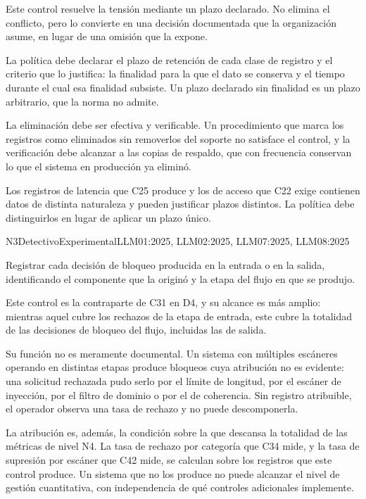 Este control resuelve la tensión mediante un plazo declarado. No elimina el conflicto, pero lo convierte en una decisión documentada que la organización asume, en lugar de una omisión que la expone.

La política debe declarar el plazo de retención de cada clase de registro y el criterio que lo justifica: la finalidad para la que el dato se conserva y el tiempo durante el cual esa finalidad subsiste. Un plazo declarado sin finalidad es un plazo arbitrario, que la norma no admite.

La eliminación debe ser efectiva y verificable. Un procedimiento que marca los registros como eliminados sin removerlos del soporte no satisface el control, y la verificación debe alcanzar a las copias de respaldo, que con frecuencia conservan lo que el sistema en producción ya eliminó.

Los registros de latencia que C25 produce y los de acceso que C22 exige contienen datos de distinta naturaleza y pueden justificar plazos distintos. La política debe distinguirlos en lugar de aplicar un plazo único.


  {N3}{Detectivo}{Experimental}{LLM01:2025, LLM02:2025, LLM07:2025, LLM08:2025}

Registrar cada decisión de bloqueo producida en la entrada o en la salida, identificando el componente que la originó y la etapa del flujo en que se produjo.

Este control es la contraparte de C31 en D4, y su alcance es más amplio: mientras aquel cubre los rechazos de la etapa de entrada, este cubre la totalidad de las decisiones de bloqueo del flujo, incluidas las de salida.

Su función no es meramente documental. Un sistema con múltiples escáneres operando en distintas etapas produce bloqueos cuya atribución no es evidente: una solicitud rechazada pudo serlo por el límite de longitud, por el escáner de inyección, por el filtro de dominio o por el de coherencia. Sin registro atribuible, el operador observa una tasa de rechazo y no puede descomponerla.

La atribución es, además, la condición sobre la que descansa la totalidad de las métricas de nivel N4. La tasa de rechazo por categoría que C34 mide, y la tasa de supresión por escáner que C42 mide, se calculan sobre los registros que este control produce. Un sistema que no los produce no puede alcanzar el nivel de gestión cuantitativa, con independencia de qué controles adicionales implemente.

